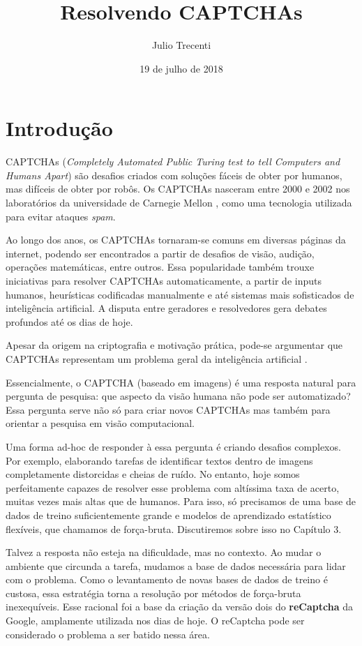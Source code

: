 \documentclass[12pt,]{report}
\title{Resolvendo CAPTCHAs}
\author{Julio Trecenti}
\date{19 de julho de 2018}
\begin{document}
\maketitle

{
\hypersetup{linkcolor=black}
\setcounter{tocdepth}{2}
\tableofcontents
}
\listoftables
\listoffigures
\chapter{Introdução}\label{introducao}

CAPTCHAs (\emph{Completely Automated Public Turing test to tell
Computers and Humans Apart}) são desafios criados com soluções fáceis de
obter por humanos, mas difíceis de obter por robôs. Os CAPTCHAs nasceram
entre 2000 e 2002 nos laboratórios da universidade de Carnegie Mellon
\citep{von2002telling}, como uma tecnologia utilizada para evitar
ataques \emph{spam}.

Ao longo dos anos, os CAPTCHAs tornaram-se comuns em diversas páginas da
internet, podendo ser encontrados a partir de desafios de visão,
audição, operações matemáticas, entre outros. Essa popularidade também
trouxe iniciativas para resolver CAPTCHAs automaticamente, a partir de
inputs humanos, heurísticas codificadas manualmente e até sistemas mais
sofisticados de inteligência artificial. A disputa entre geradores e
resolvedores gera debates profundos até os dias de hoje.

Apesar da origem na criptografia e motivação prática, pode-se argumentar
que CAPTCHAs representam um problema geral da inteligência artificial
\citep{george2017generative}.

Essencialmente, o CAPTCHA (baseado em imagens) é uma resposta natural
para pergunta de pesquisa: que aspecto da visão humana não pode ser
automatizado? Essa pergunta serve não só para criar novos CAPTCHAs mas
também para orientar a pesquisa em visão computacional.

Uma forma ad-hoc de responder à essa pergunta é criando desafios
complexos. Por exemplo, elaborando tarefas de identificar textos dentro
de imagens completamente distorcidas e cheias de ruído. No entanto, hoje
somos perfeitamente capazes de resolver esse problema com altíssima taxa
de acerto, muitas vezes mais altas que de humanos. Para isso, só
precisamos de uma base de dados de treino suficientemente grande e
modelos de aprendizado estatístico flexíveis, que chamamos de
força-bruta. Discutiremos sobre isso no Capítulo 3.

Talvez a resposta não esteja na dificuldade, mas no contexto. Ao mudar o
ambiente que circunda a tarefa, mudamos a base de dados necessária para
lidar com o problema. Como o levantamento de novas bases de dados de
treino é custosa, essa estratégia torna a resolução por métodos de
força-bruta inexequíveis. Esse racional foi a base da criação da versão
dois do \textbf{reCaptcha} da Google, amplamente utilizada nos dias de
hoje. O reCaptcha pode ser considerado o problema a ser batido nessa
área.
\end{document}
